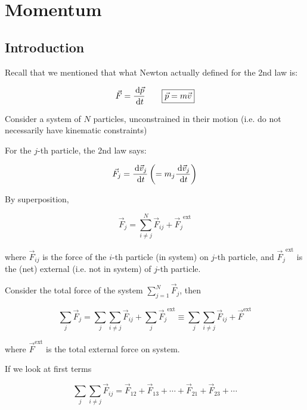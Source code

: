 \chapter{Momentum}

\section{Introduction}

Recall that we mentioned that what Newton actually defined for the 2nd law is:

\begin{equation}
	\vec F = \frac{\D \vec p}{\D t} \qquad \boxed{\vec p = m \vec v}
\end{equation}

Consider a system of $N$ particles, unconstrained in their motion (i.e. do not necessarily have kinematic constraints)

For the $j$-th particle, the 2nd law says:

\begin{equation}
	\vec F_j  = \frac{\D \vec v_j}{\D t} \left(= m_j \frac{\D \vec v_j}{\D t}\right)
\end{equation}

By superposition, 

\begin{equation}
	\vec F_j = \sum_{i\neq j}^N \vec F_{ij} + {\vec F_j}^\mathrm{ext}
\end{equation}

where $\vec F_{ij}$ is the force of the $i$-th particle (in system) on $j$-th particle, and ${\vec F_j}^\mathrm{ext}$ is the (net) external (i.e. not in system) of $j$-th particle.

Consider the total force of the system $\sum_{j=1}^{N} \vec F_j$, then

\begin{equation}
	\sum_j \vec F_j = \sum_j \sum_{i \neq j} \vec F_{ij} + \sum_j {\vec F_j}^\mathrm{ext} \equiv \sum_j \sum_{i\neq j} \vec F_{ij} + {\vec F}^\mathrm{ext}
\end{equation}

where ${\vec F}^\mathrm{ext}$ is the total external force on system.

If we look at first terms

\begin{equation}
	\sum_j \sum_{i\neq j} \vec F_{ij} = \vec F_{12} + \vec F_{13} + \cdots + \vec F_{21} + \vec F_{23} + \cdots
\end{equation}

